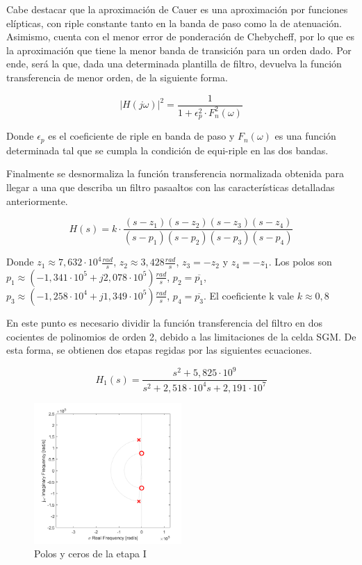 Cabe destacar que la aproximaci\'on de Cauer es una aproximaci\'on por funciones el\'ipticas, con riple constante tanto en la banda de paso como la de atenuaci\'on. Asimismo, cuenta con el menor error de ponderaci\'on de Chebycheff, por lo que es la aproximaci\'on que tiene la menor banda de transici\'on para un orden dado. Por ende, ser\'a la que, dada una determinada plantilla de filtro, devuelva la funci\'on transferencia de menor orden, de la siguiente forma.

\begin{equation}
|H(j\omega)|^2 = \frac{1}{1+\epsilon_p^2 \cdot F_n^2(\omega)}
\end{equation}

Donde $\epsilon_p$ es el coeficiente de riple en banda de paso y $F_n(\omega)$ es una funci\'on determinada tal que se cumpla la condici\'on de equi-riple en las dos bandas.

Finalmente se desnormaliza la funci\'on transferencia normalizada obtenida para llegar a una que describa un filtro pasaaltos con las caracter\'isticas detalladas anteriormente.

\begin{equation}
H(s) = k \cdot \frac{(s-z_1)(s-z_2)(s-z_3)(s-z_4)}{(s-p_1)(s-p_2)(s-p_3)(s-p_4)}
\end{equation}

Donde $z_1 \approx 7,632 \cdot 10^4 \frac{rad}{s}$, $z_2 \approx 3,428 \frac{rad}{s}$, $z_3 = -z_2$ y $z_4 = -z_1$. Los polos son $p_1 \approx (-1,341\cdot 10^5 +j2,078\cdot 10^5)\frac{rad}{s}$, $p_2 = \overline{p_1}$, $p_3 \approx (-1,258\cdot 10^4 + j1,349\cdot 10^5) \frac{rad}{s}$, $p_4 = \overline{p_3}$. El coeficiente k vale $k \approx 0,8$

En este punto es necesario dividir la funci\'on transferencia del filtro en dos cocientes de polinomios de orden 2, debido a las limitaciones de la celda SGM. De esta forma, se obtienen dos etapas regidas por las siguientes ecuaciones.


\begin{equation} 
\label{transf_stage1}
H_1(s) = \frac{s^2 + 5,825 \cdot 10^9}{s^2 + 2,518 \cdot 10^4 s + 2,191 \cdot 10^7}
\end{equation}

\begin{figure}[H] 
    \centering
    \includegraphics[width=0.5\textwidth]{../EJ3/Resources/polezero_stagei.png}
    \caption{Polos y ceros de la etapa I}
    \label{EJ3_PZEI}
\end{figure}

